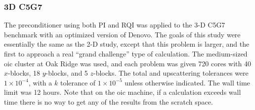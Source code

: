 \documentclass[preprint,12pt]{elsarticle}
\begin{document}
\subsubsection{3D C5G7}
\label{subsec:3dc5g7}
The preconditioner using both PI and RQI was applied to the 3-D C5G7 benchmark with an optimized version of Denovo. The goals of this study were essentially the same as the 2-D study, except that this problem is larger, and the first to approach a real ``grand challenge'' type of calculation. The medium-sized oic cluster at Oak Ridge was used, and each problem was given 720 cores with 40 $x$-blocks, 18 $y$-blocks, and 5 $z$-blocks. The total and upscattering tolerances were $1 \times 10^{-4}$, with a $k$ tolerance of $1 \times 10^{-5}$ unless otherwise indicated. The wall time limit was 12 hours. Note that on the oic machine, if a calculation exceeds wall time there is no way to get any of the results from the scratch space. 
\end{document}
